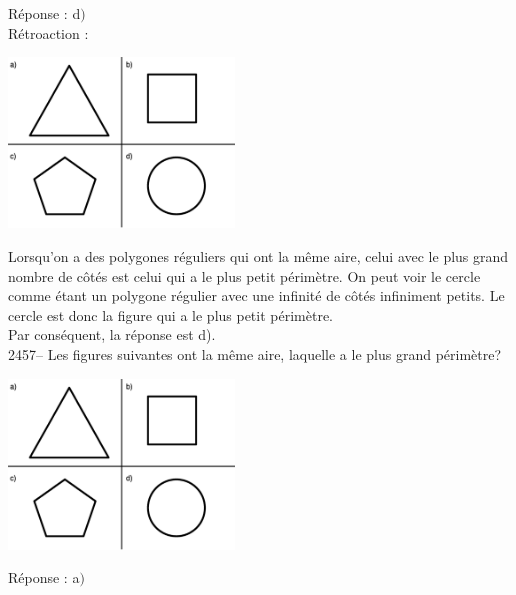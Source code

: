 \documentclass[letterpaper, 12pt]{article}
\begin{document}
R\'eponse : d$)$\\

R\'etroaction :\\
\begin{center}
 \includegraphics[width=6cm,bb=0 0 735 555]{Q2456.eps}
\end{center}
Lorsqu'on a des polygones r\'eguliers qui ont la m\^eme aire, celui avec le plus grand nombre de c\^ot\'es est celui qui a le plus petit p\'erim\`etre. On peut voir le cercle comme \'etant un polygone r\'egulier avec une infinit\'e de c\^ot\'es infiniment petits. Le cercle est donc la figure qui a le plus petit p\'erim\`etre.\\
Par cons\'equent, la r\'eponse est d).\\

2457-- Les figures suivantes ont la m\^eme aire, laquelle a le plus grand p\'erim\`etre?\\
\begin{center}
 \includegraphics[width=6cm,bb=0 0 735 555]{Q2456.eps}
\end{center}

R\'eponse : a$)$\\
\end{document}
